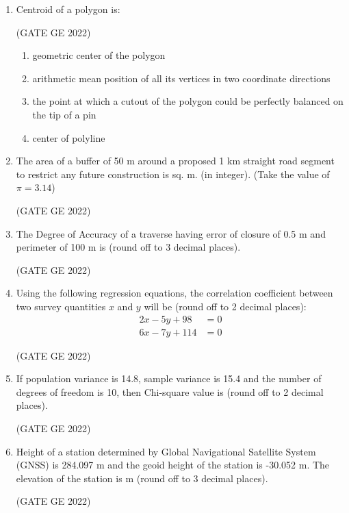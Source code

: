 \documentclass[journal,12pt,onecolumn]{IEEEtran}
\theoremstyle{remark}
\begin{document}
\begin{enumerate}
\item Centroid of a polygon is:

\hfill (GATE GE 2022)

\begin{enumerate}
    \item geometric center of the polygon
    \item arithmetic mean position of all its vertices in two coordinate directions
    \item the point at which a cutout of the polygon could be perfectly balanced on the tip of a pin
    \item center of polyline
\end{enumerate}

\item The area of a buffer of 50 m around a proposed 1 km straight road segment to restrict any future construction is \makebox[1cm]{\hrulefill} sq. m. (in integer). (Take the value of $\pi = 3.14$)

\hfill (GATE GE 2022)

\item The Degree of Accuracy of a traverse having error of closure of 0.5 m and perimeter of 100 m is \makebox[1cm]{\hrulefill} (round off to 3 decimal places).

\hfill (GATE GE 2022)

\item Using the following regression equations, the correlation coefficient between two survey quantities $x$ and $y$ will be \makebox[1cm]{\hrulefill} (round off to 2 decimal places):
\begin{align*}
2x - 5y + 98 &= 0 \\
6x - 7y + 114 &= 0
\end{align*}

\hfill (GATE GE 2022)

\item If population variance is 14.8, sample variance is 15.4 and the number of degrees of freedom is 10, then Chi-square value is \makebox[1cm]{\hrulefill} (round off to 2 decimal places).

\hfill (GATE GE 2022)

\item Height of a station determined by Global Navigational Satellite System (GNSS) is 284.097 m and the geoid height of the station is -30.052 m. The elevation of the station is \makebox[1cm]{\hrulefill} m (round off to 3 decimal places).

\hfill (GATE GE 2022)


\end{enumerate}
\end{document}
